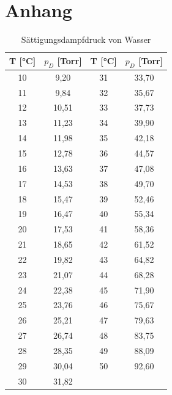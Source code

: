 \onecolumn
\chapter{Anhang}
\begin{table}[h!]
\centering
\begin{tabular}{c|c||c|c}
\hline
T [°C] & $p_D$ [Torr] & T [°C] & $p_D$ [Torr] \\
\hline
10 & 9,20  & 31 & 33,70 \\
11 & 9,84  & 32 & 35,67 \\
12 & 10,51 & 33 & 37,73 \\
13 & 11,23 & 34 & 39,90 \\
14 & 11,98 & 35 & 42,18 \\
15 & 12,78 & 36 & 44,57 \\
16 & 13,63 & 37 & 47,08 \\
17 & 14,53 & 38 & 49,70 \\
18 & 15,47 & 39 & 52,46 \\
19 & 16,47 & 40 & 55,34 \\
20 & 17,53 & 41 & 58,36 \\
21 & 18,65 & 42 & 61,52 \\
22 & 19,82 & 43 & 64,82 \\
23 & 21,07 & 44 & 68,28 \\
24 & 22,38 & 45 & 71,90 \\
25 & 23,76 & 46 & 75,67 \\
26 & 25,21 & 47 & 79,63 \\
27 & 26,74 & 48 & 83,75 \\
28 & 28,35 & 49 & 88,09 \\
29 & 30,04 & 50 & 92,60 \\
30 & 31,82 &    &       \\
\hline
\end{tabular}
\label{tab:wasser_druck}
\caption{Sättigungsdampfdruck von Wasser}
\end{table}

\newpage

